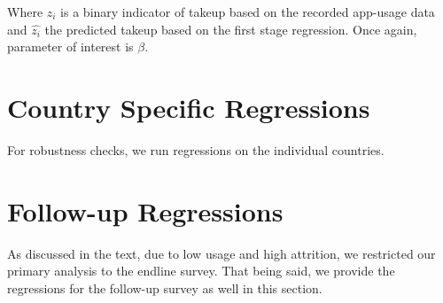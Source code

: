 Where $z_i$ is a binary indicator of takeup based on the recorded app-usage data and $\hat{z_i}$ the predicted takeup based on the first stage regression. Once again, parameter of interest is $\beta$.








\section{Country Specific Regressions}

For robustness checks, we run regressions on the individual countries.









% 
% 
% 

% 
% 
% 

\section{Follow-up Regressions}

As discussed in the text, due to low usage and high attrition, we restricted our primary analysis to the endline survey. That being said, we provide the regressions for the follow-up survey as well in this section.

